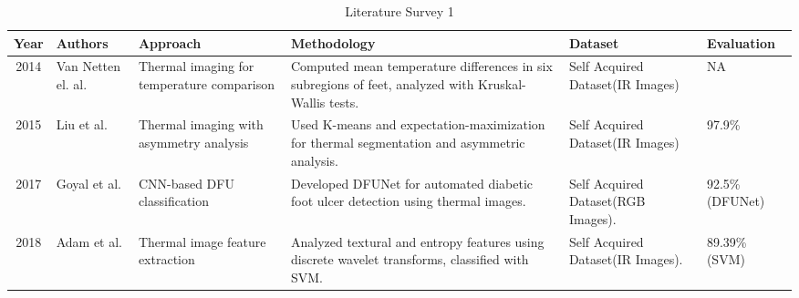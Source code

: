 \begin{table}[hbt]
    \centering
    \begin{tabularx}{\linewidth}{|c|X|X|X|X|X|}
    \hline
        \textbf{Year} & \textbf{Authors} & \textbf{Approach} & \textbf{Methodology} & \textbf{Dataset} & \textbf{Evaluation} \\ \hline
        2014 & \cite{van_Netten_2014}{Van Netten el. al.} & Thermal imaging for temperature comparison & Computed mean temperature differences in six subregions of feet, analyzed with Kruskal-Wallis tests. & Self Acquired Dataset(IR Images) & NA \\ \hline
        2015 & \cite{Liu_2015}{Liu et al.} & Thermal imaging with asymmetry analysis & Used K-means and expectation-maximization for thermal segmentation and asymmetric analysis. & Self Acquired Dataset(IR Images) & 97.9\% \\ \hline
        2017 & \cite{Goyal_2018}{Goyal et al.} & CNN-based DFU classification & Developed DFUNet for automated diabetic foot ulcer detection using thermal images. & Self Acquired Dataset(RGB Images). & 92.5\% (DFUNet) \\ \hline
        2018 & \cite{Adam_2018}{Adam et al.} & Thermal image feature extraction & Analyzed textural and entropy features using discrete wavelet transforms, classified with SVM. & Self Acquired Dataset(IR Images). & 89.39\% (SVM) \\ \hline
    \end{tabularx}
    \caption {Literature Survey 1}
    \end{table}

